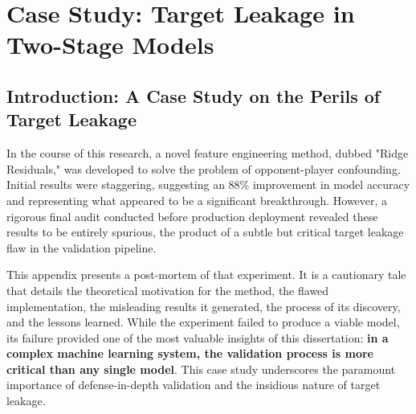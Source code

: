 %
%

\chapter{Case Study: Target Leakage in Two-Stage Models}
\label{app:orthogonalization}
\label{app:leakage-case-study}

\section{Introduction: A Case Study on the Perils of Target Leakage}

In the course of this research, a novel feature engineering method, dubbed "Ridge Residuals," was developed to solve the problem of opponent-player confounding. Initial results were staggering, suggesting an 88\% improvement in model accuracy and representing what appeared to be a significant breakthrough. However, a rigorous final audit conducted before production deployment revealed these results to be entirely spurious, the product of a subtle but critical target leakage flaw in the validation pipeline.

This appendix presents a post-mortem of that experiment. It is a cautionary tale that details the theoretical motivation for the method, the flawed implementation, the misleading results it generated, the process of its discovery, and the lessons learned. While the experiment failed to produce a viable model, its failure provided one of the most valuable insights of this dissertation: \textbf{in a complex machine learning system, the validation process is more critical than any single model}. This case study underscores the paramount importance of defense-in-depth validation and the insidious nature of target leakage.

